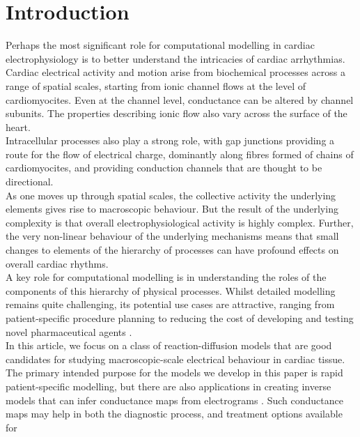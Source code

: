 \documentclass{article}
\begin{document}


    \section{Introduction}
    Perhaps the most significant role for computational modelling in cardiac electrophysiology is to better understand the
    intricacies of cardiac arrhythmias. Cardiac electrical activity and motion arise from biochemical processes across a range of spatial scales, starting from ionic channel flows at the level of cardiomyocites.  Even at the channel level, conductance can be altered by channel subunits. The properties describing ionic flow also vary across the surface of the heart.\\
    
    Intracellular processes also play a strong role, with gap junctions providing a route for the flow of electrical charge, dominantly along fibres formed of chains of cardiomyocites, and providing conduction channels that are thought to be directional. \\
    
    As one moves up through spatial scales, the collective activity the underlying elements gives rise to macroscopic behaviour. But the result of the underlying complexity is that overall electrophysiological activity is highly complex. Further, the very non-linear behaviour of the underlying mechanisms means that small changes to elements of the hierarchy of processes can have profound effects on overall cardiac rhythms. \\
    
    A key role for computational modelling is in understanding the roles of the components of this hierarchy of physical processes. Whilst detailed modelling remains quite challenging, its potential use cases are attractive, ranging from patient-specific procedure planning to reducing the cost of developing and testing novel pharmaceutical agents \cite{Mayourian2018AnArrhythmogenicity}.\\
    
    In this article, we focus on a class of reaction-diffusion models that are good candidates for studying macroscopic-scale electrical behaviour in cardiac tissue. The primary intended purpose for the models we develop in this paper is rapid patient-specific modelling, but there are also applications in creating inverse models that can infer conductance maps from electrograms \cite{Martins2006EstimatingAlgorithms, Abdi2019AEstimation}. Such conductance maps may help in both the diagnostic process, and treatment options available for 
    
\end{document}
